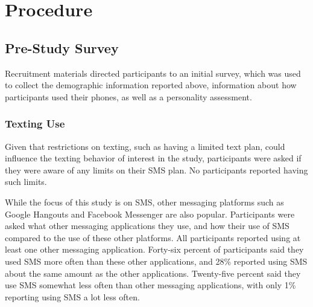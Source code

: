 \documentclass[12pt]{nuthesis}	%
\begin{document}
\section{Procedure}

\subsection{Pre-Study Survey}

Recruitment materials directed participants to an initial survey, which was used to collect the demographic information reported above, information about how participants used their phones, as well as a personality assessment.

\subsubsection{Texting Use}
Given that restrictions on texting, such as having a limited text plan, could influence the texting behavior of interest in the study, participants were asked if they were aware of any limits on their SMS plan. No participants reported having such limits.

While the focus of this study is on SMS, other messaging platforms such as Google Hangouts and Facebook Messenger are also popular. Participants were asked what other messaging applications they use, and how their use of SMS compared to the use of these other platforms. All participants reported using at least one other messaging application. Forty-six percent of participants said they used SMS more often than these other applications, and 28\% reported using SMS about the same amount as the other applications. Twenty-five percent said they use SMS somewhat less often than other messaging applications, with only 1\% reporting using SMS a lot less often.

\end{document}
